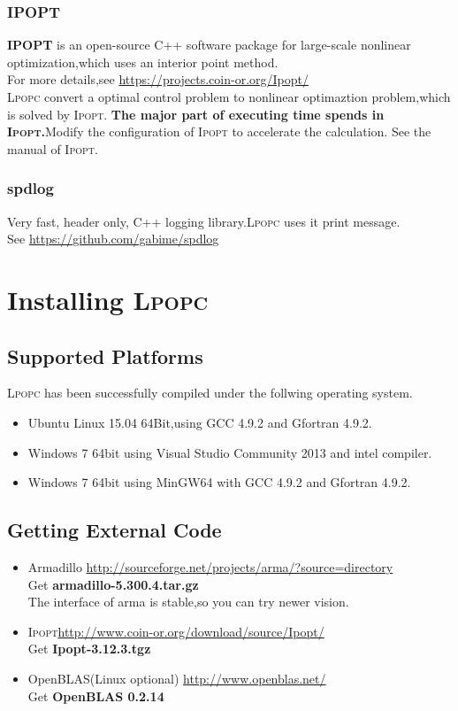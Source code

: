 \documentclass[10pt]{article}
\newcommand{\Ipopt}{\textsc{Ipopt}\xspace}
\newcommand{\LPOPC}{\textsc{Lpopc}\xspace}
\begin{document}
	     \subsubsection{IPOPT}
	     \textbf{IPOPT} is an open-source C++ software package for large-scale nonlinear optimization,which uses an interior point method\cite{wachter2006implementation}.\\
	     For more details,see \url{https://projects.coin-or.org/Ipopt/}\\
	     \LPOPC convert a optimal control problem to nonlinear optimaztion problem,which is solved by \Ipopt.
	     \textbf{The major part of executing time spends in \Ipopt.}Modify the configuration of \Ipopt to accelerate the calculation. See the manual of \Ipopt. 
	     \subsubsection{spdlog}
	     Very fast, header only, C++ logging library.\LPOPC uses it print message.\\
	     See
	     \url{https://github.com/gabime/spdlog}
\section{Installing \LPOPC}
 \subsection*{Supported Platforms}
 \LPOPC has been successfully compiled under the follwing operating system.
 \begin{itemize}
 	\item Ubuntu Linux 15.04 64Bit,using GCC 4.9.2 and Gfortran 4.9.2.
 	\item Windows 7 64bit using Visual Studio Community 2013 and intel compiler.
 	\item Windows 7 64bit using MinGW64 with GCC 4.9.2 and Gfortran 4.9.2.

 \end{itemize}
 \subsection*{Getting External Code}
  \begin{itemize}
  	\item Armadillo \url{http://sourceforge.net/projects/arma/?source=directory}\\ 
  	Get \textbf{armadillo-5.300.4.tar.gz}\\
  	 The interface of arma is stable,so you can try newer vision.
  	\item \Ipopt \url{http://www.coin-or.org/download/source/Ipopt/} \\
  	Get \textbf{Ipopt-3.12.3.tgz}
  	\item OpenBLAS(Linux optional) \url{http://www.openblas.net/}\\
  	 Get \textbf{OpenBLAS 0.2.14}
  \end{itemize}
\end{document}
